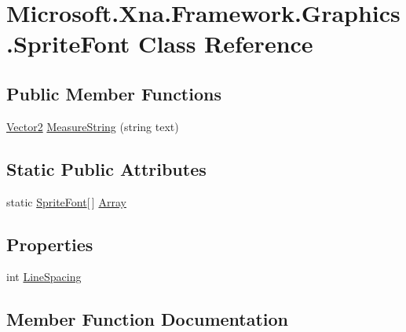 \hypertarget{class_microsoft_1_1_xna_1_1_framework_1_1_graphics_1_1_sprite_font}{}\section{Microsoft.\+Xna.\+Framework.\+Graphics.\+Sprite\+Font Class Reference}
\label{class_microsoft_1_1_xna_1_1_framework_1_1_graphics_1_1_sprite_font}
\subsection*{Public Member Functions}
\begin{DoxyCompactItemize}
\item 
\hyperlink{struct_microsoft_1_1_xna_1_1_framework_1_1_vector2}{Vector2} \hyperlink{class_microsoft_1_1_xna_1_1_framework_1_1_graphics_1_1_sprite_font_a4ec6eda696f8b33217da56130bc52765}{Measure\+String} (string text)
\end{DoxyCompactItemize}
\subsection*{Static Public Attributes}
\begin{DoxyCompactItemize}
\item 
static \hyperlink{class_microsoft_1_1_xna_1_1_framework_1_1_graphics_1_1_sprite_font}{Sprite\+Font}\mbox{[}$\,$\mbox{]} \hyperlink{class_microsoft_1_1_xna_1_1_framework_1_1_graphics_1_1_sprite_font_aeec08bdf6ba28d59965275a86b434b88}{Array}
\end{DoxyCompactItemize}
\subsection*{Properties}
\begin{DoxyCompactItemize}
\item 
int \hyperlink{class_microsoft_1_1_xna_1_1_framework_1_1_graphics_1_1_sprite_font_a6094ad9376de53d8d86b385d9d492b92}{Line\+Spacing}
\end{DoxyCompactItemize}


\subsection{Member Function Documentation}
\hypertarget{class_microsoft_1_1_xna_1_1_framework_1_1_graphics_1_1_sprite_font_a4ec6eda696f8b33217da56130bc52765}{}

